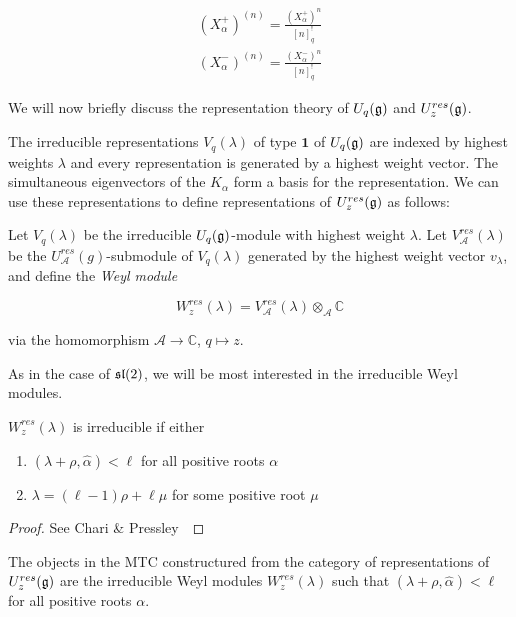\begin{align}
     (X_\alpha^+)^{(n)} = \frac{ (X_\alpha^+)^n}{[n]^!_{q}} \\
    (X_\alpha^-)^{(n)} = \frac{(X_\alpha^-)^n}{[n]^!_{q}} 
\end{align}


We will now briefly discuss the representation theory of $U_q(\mathfrak{g})$ and $U_z^{res}(\mathfrak{g})$.

The irreducible representations $V_q(\lambda)$ of type $\mathbf{1}$ of
$U_q(\mathfrak{g})$ are indexed by highest weights $\lambda$ and every representation
is generated by a highest weight vector. The simultaneous eigenvectors of the
$K_\alpha$ form a basis for the representation. We can use these
representations to define representations of $U_z^{res}(\mathfrak{g})$ as follows:

Let $V_q(\lambda)$ be the irreducible $U_q(\mathfrak{g})$-module with highest weight
$\lambda$. Let $V_\mathcal{A}^{res}(\lambda)$ be the
$U_\mathcal{A}^{res}(g)$-submodule of $V_q(\lambda)$ generated by the highest
weight vector $v_\lambda$, and define the \emph{Weyl module}

\begin{equation}
    W_z^{res}(\lambda) = V_\mathcal{A}^{res}(\lambda) \otimes_\mathcal{A} \mathbb{C}
\end{equation}

via the homomorphism $\mathcal{A} \to \mathbb{C}$, $q \mapsto z$.

As in the case of $\mathfrak{sl}(2)$, we will be most interested in the irreducible Weyl
modules. 

\begin{claim}
    $W_z^{res}(\lambda)$ is irreducible if either 
    \begin{enumerate}
        \item $(\lambda + \rho, \hat{\alpha}) < \ell$ for all positive
            roots $\alpha$
        \item $\lambda = (\ell - 1) \rho + \ell \mu$ for some positive root $\mu$
    \end{enumerate}
\end{claim}
\begin{proof}
See Chari \& Pressley~\cite{CP}
\end{proof}

The objects in the MTC constructured from the category of representations of
$U_z^{res}(\mathfrak{g})$ are the irreducible Weyl modules $W_z^{res}(\lambda)$ such
that $(\lambda + \rho, \hat{\alpha}) < \ell$ for all positive roots $\alpha$.
